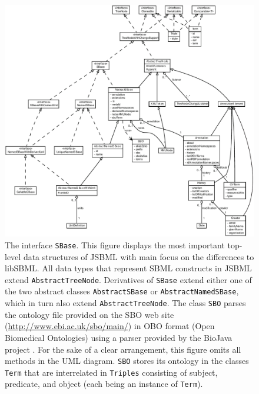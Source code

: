 \begin{figure}[p]
 \centering
 \includegraphics[width=\textwidth]{img/SBase.pdf}
 \caption[The interface \texttt{SBase}]{The interface \texttt{SBase}. 
This figure displays the most important top-level data
structures of JSBML with main focus on the differences to libSBML. All data
types that represent SBML constructs in JSBML extend \texttt{AbstractTreeNode}. 
Derivatives of \texttt{SBase} extend either one of the two abstract classes
\texttt{AbstractSBase} or \texttt{AbstractNamedSBase}, which in turn also extend
\texttt{AbstractTreeNode}. The class \texttt{SBO} parses the
ontology file provided on the SBO web site
(\url{http://www.ebi.ac.uk/sbo/main/}) in OBO format (Open Biomedical
Ontologies) using a parser provided by the BioJava project \citep{Holland2008}.
For the sake of a clear arrangement, this figure omits all methods in the UML
diagram. \texttt{SBO} stores its ontology in the classes \texttt{Term} that are
interrelated in \texttt{Triples} consisting of subject, predicate, and object
(each being an instance of \texttt{Term}).}
 \label{fig:SBase}
\end{figure}
